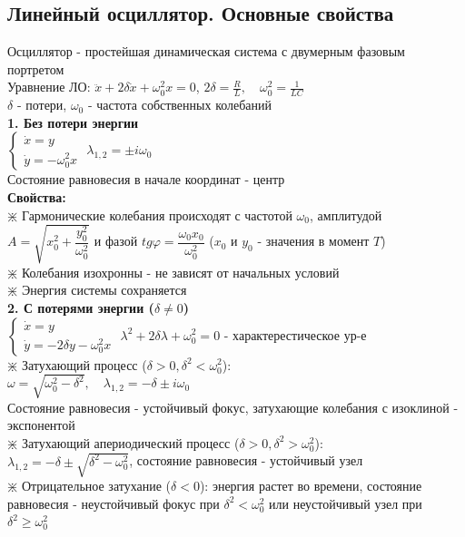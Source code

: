 \begin{multicols*}{2}
		\section{Линейный осциллятор. Основные свойства}
		Осциллятор - простейшая динамическая система с двумерным фазовым портретом\\
		Уравнение ЛО: $\ddot{x} + 2\delta \dot{x} + \omega_0^2 x = 0$, \quad $2\delta = \frac{R}{L}, \quad \omega_0^2 = \frac{1}{LC}$\\
		$\delta $ - потери, $\omega_0$ - частота собственных колебаний\\
		\textbf{1. Без потери энергии}\\
		$\begin{cases}
			\dot{x} = y \\
			\dot{y} = -\omega_0^2 x
		\end{cases} $
		\quad \quad $\lambda_{1,2} = \pm i\omega_0$\\
		Состояние равновесия в начале координат - центр\\
		\textbf{Свойства:}\\
		$\divideontimes$ Гармонические колебания происходят с частотой $\omega_0$, амплитудой $A = \sqrt{x_0^2 + \dfrac{y_0^2}{\omega_0^2}}$ и фазой $tg \varphi = \dfrac{\omega_0 x_0}{\omega_0^2}$ ($x_0$ и $y_0$ - значения в момент $T$)\\
		$\divideontimes$ Колебания изохронны - не зависят от начальных условий\\
		$\divideontimes$ Энергия системы сохраняется\\
		\textbf{2. С потерями энергии ($\delta \neq 0$)}\\
		$\begin{cases}
			\dot{x} = y \\
			\dot{y} = -2\delta y-\omega_0^2 x
		\end{cases} $
		\quad \quad $\lambda^2 + 2\delta \lambda + \omega_0^2 = 0$ - характерестическое ур-е\\
		$\divideontimes$ Затухающий процесс ($\delta > 0, \delta^2 < \omega_0^2$):\\
		$\omega = \sqrt{\omega_0^2 - \delta^2}, \quad \lambda_{1,2} = -\delta \pm i\omega_0$\\
		Состояние равновесия - устойчивый фокус, затухающие колебания с изоклиной - экспонентой\\
		$\divideontimes$ Затухающий апериодический процесс ($\delta > 0, \delta^2 > \omega_0^2$):\\
		$\lambda_{1,2} = -\delta \pm \sqrt{\delta^2 - \omega_0^2}$, состояние равновесия - устойчивый узел\\
		$\divideontimes$ Отрицательное затухание ($\delta<0$): энергия растет во времени, состояние равновесия - неустойчивый фокус при $\delta^2<\omega_0^2$ или неустойчивый узел при $\delta^2\geqslant \omega_0^2$
		

\end{multicols*}
